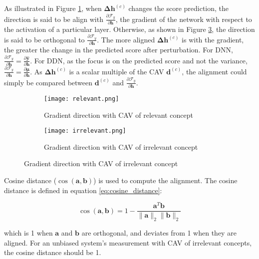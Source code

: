 As illustrated in Figure \ref{fig:relevant}, when $\boldsymbol{\Delta h}^{(c)}$ changes the score prediction, the direction is said to be align with $\frac{\partial \mathcal{F}_y}{\partial \boldsymbol{h}}$, the gradient of the network with respect to the activation of a particular layer.  Otherwise, as shown in Figure \ref{fig:irrelevant}, the direction is said to be orthogonal to $\frac{\partial \mathcal{F}_y}{\partial \boldsymbol{h}}$. The more aligned $\boldsymbol{\Delta h}^{(c)}$ is with the gradient, the greater the change in the predicted score after perturbation. For DNN, $\frac{\partial \mathcal{F}_y}{\partial \boldsymbol{h}} = \frac{\partial \mathbf{\hat{y}}}{\partial \boldsymbol{h}}$. For DDN, as the focus is on the predicted score and not the variance, $\frac{\partial \mathcal{F}_y}{\partial \boldsymbol{h}} = \frac{\partial \mathbf{\mu}}{\partial \boldsymbol{h}}$. As $\boldsymbol{\Delta h}^{(c)}$ is a scalar multiple of the CAV $\boldsymbol{d}^{(c)}$, the alignment could simply be compared between $\boldsymbol{d}^{(c)}$ and $\frac{\partial \mathcal{F}_y}{\partial \boldsymbol{h}}$.

\begin{figure}[H]
    \centering
    \begin{subfigure}{0.45\textwidth}
        \texttt{[image: relevant.png]}
        \caption{Gradient direction with CAV of relevant concept}
        \label{fig:relevant}
    \end{subfigure}
    \hfill
    \begin{subfigure}{0.45\textwidth}
        \texttt{[image: irrelevant.png]}
        \caption{Gradient direction with CAV of irrelevant concept}
        \label{fig:irrelevant}
    \end{subfigure}
\end{figure}

Cosine distance ($\cos(\boldsymbol{a}, \boldsymbol{b})$) is used to compute the alignment. The cosine distance is defined in equation \ref{eq:cosine_distance}:

\begin{equation} \label{eq:cosine_distance}
    \cos(\boldsymbol{a}, \boldsymbol{b}) = 1 - \frac{\boldsymbol{a}^T \boldsymbol{b}}{\|\boldsymbol{a}\|_2 \|\boldsymbol{b}\|_2}
\end{equation}

which is 1 when $\boldsymbol{a}$ and $\boldsymbol{b}$ are orthogonal, and deviates from 1 when they are aligned. For an unbiased system's measurement with CAV of irrelevant concepts, the cosine distance should be 1.

